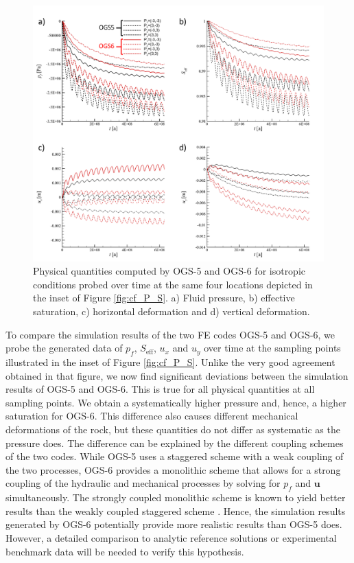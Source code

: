 \begin{figure}[t]
\includegraphics[width=\textwidth, trim=0.5cm  0.0cm 0 0.0cm, clip]{./figures/MEX10_probe_over_time_isotropic.png}
\caption{Physical quantities computed by OGS-5 and OGS-6 for isotropic conditions probed over time at the same four locations depicted in the inset of Figure \ref{fig:cf_P_S}. a) Fluid pressure, b) effective saturation, c) horizontal deformation and d) vertical deformation.}
\label{fig:RM_probe_over_time_isotropic}
\end{figure}

To compare the simulation results of the two FE codes OGS-5 and OGS-6, we probe the generated data of $p_f$, $S_\text{eff}$, $u_x$ and $u_y$ over time at the sampling points illustrated in the inset of Figure \ref{fig:cf_P_S}. Unlike the very good agreement obtained in that figure, we now find significant deviations between the simulation results of OGS-5 and OGS-6. This is true for all physical quantities at all sampling points. We obtain a systematically higher pressure and, hence, a higher saturation for OGS-6. This difference also causes different mechanical deformations of the rock, but these quantities do not differ as systematic as the pressure does. The difference can be explained by the different coupling schemes of the two codes. While OGS-5 uses a staggered scheme with a weak coupling of the two processes, OGS-6 provides a monolithic scheme that allows for a strong coupling of the hydraulic and mechanical processes by solving for $p_f$ and $\textbf{u}$ simultaneously. The strongly coupled monolithic scheme is known to yield better results than the weakly coupled staggered scheme \cite{hubner2003,farhat2000}. Hence, the simulation results generated by OGS-6 potentially provide more realistic results than OGS-5 does. However, a detailed comparison to analytic reference solutions or experimental benchmark data will be needed to verify this hypothesis.


